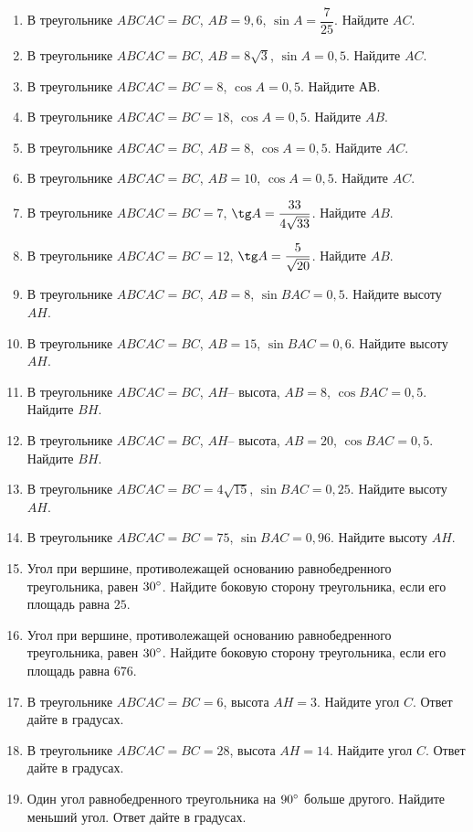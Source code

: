 \documentclass[12pt, a4paper]{article}
\begin{document}
\begin{enumerate}
		\item В треугольнике \(ABC AC=BC\), \(AB=9,6\),  \( \sin A=\dfrac{7}{25} \).  Найдите \( AC \).
		\item В треугольнике \( ABC AC=BC \), \( AB = 8\sqrt{3}  \),  \( \sin A=0,5 \). Найдите \( AC \).
		\item В треугольнике \(ABC AC=BC=8\),  \( \cos A=0,5 \). Найдите \( АВ \).
		\item В треугольнике \( ABC AC=BC=18 \),  \( \cos A=0,5 \). Найдите \( AB \).
		\item В треугольнике \(ABC AC=BC\), \( AB=8 \),  \( \cos A=0,5 \). Найдите \( AC \).
		\item В треугольнике \(ABC AC=BC\), \( AB=10 \),  \( \cos A=0,5 \). Найдите \( AC \).
		\item В треугольнике \(ABC AC=BC=7\),  \( \tg A=\dfrac{33}{4\sqrt{33}} \).  Найдите \( AB \).
		\item В треугольнике \(ABC AC=BC=12 \),  \( \tg A=\dfrac{5}{\sqrt{20}} \).  Найдите \( AB \).
		\item В треугольнике \(ABC AC=BC\), \( AB=8 \),  \( \sin BAC=0,5 \). Найдите высоту \( AH \).
		\item В треугольнике \(ABC AC=BC\), \( AB=15\),  \( \sin BAC=0,6 \). Найдите высоту \( AH \).
		\item В треугольнике \(ABC AC=BC\), \( AH – \) высота, \( AB=8 \),  \( \cos BAC=0,5 \). Найдите \( BH \).
		\item В треугольнике \(ABC AC=BC\), \( AH – \) высота, \( AB=20 \),  \( \cos BAC=0,5 \). Найдите \( BH \).
		\item В треугольнике \(ABC AC=BC=4\sqrt{15}\),  \( \sin BAC=0,25 \). Найдите высоту \( AH \).
		\item В треугольнике \(ABC AC=BC=75\),  \( \sin BAC=0,96 \). Найдите высоту \( AH \).
		\item Угол при вершине, противолежащей основанию равнобедренного треугольника, равен \(30\degree \). Найдите боковую сторону треугольника, если его площадь равна \(25\).
		\item Угол при вершине, противолежащей основанию равнобедренного треугольника, равен \(30\degree \). Найдите боковую сторону треугольника, если его площадь равна \(676\).
		\item В треугольнике \(ABC AC=BC=6\), высота \( AH=3 \). Найдите угол \( C \). Ответ дайте в градусах.
		\item В треугольнике \(ABC AC=BC=28\), высота \( AH=14 \). Найдите угол \( C \). Ответ дайте в градусах.
		\item Один угол равнобедренного треугольника на \( 90 \degree\) больше другого. Найдите меньший угол. Ответ дайте в градусах.

\end{enumerate}
\end{document}

